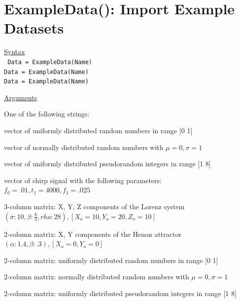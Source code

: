 \documentclass[12pt, a4paper, titlepage, openany]{book}
\begin{document}
\newpage
\section{\normalsize ExampleData():  Import Example Datasets} \label{ExampleData()}
\noindent\ul{Syntax} \vspace{6mm} \\ \noindent \texttt{\footnotesize
Data = ExampleData(Name)\\
Data = ExampleData(Name)\\
Data = ExampleData(Name)}

\noindent \ul{Arguments}
\begin{description}[labelsep=1cm, labelwidth=2cm, nosep,,style=multiline,leftmargin=3cm]\footnotesize
\item[\texttt{Name}]	One of the following strings:

\begin{description}[labelsep=1cm, labelwidth=4cm, nosep,style=multiline,leftmargin=4cm]\footnotesize
\item[\texttt{'uniform'}]	vector of uniformly distributed random numbers in range [0 1]
\item[\texttt{'gaussian'}]  vector of normally distributed random numbers with $\mu = 0, \sigma = 1$
\item[\texttt{'randintegers'}]  vector of uniformly distributed pseudorandom integers in range [1 8]
\item[\texttt{'chirp'}]   vector of chirp signal with the following parameters:\\
			    $f_0 = .01, t_1 = 4000, f_1 = .025$ \\
\item[\texttt{'lorenz'}] 3-column matrix: X, Y, Z components of the Lorenz system \\
$(\sigma: 10, \beta: \frac{8}{3}, rho: 28),   [X_o = 10, Y_o = 20, Z_o = 10]$
\item[\texttt{'henon'}] 2-column matrix: X, Y components of the Henon attractor 
	$(\alpha: 1.4, \beta: .3),   [X_o = 0, Y_o = 0] $ \\

\item[\texttt{'uniform2'}]    2-column matrix: uniformly distributed random numbers in range [0 1]
\item[\texttt{'gaussian2'}]   2-column matrix: normally distributed random numbers with $\mu = 0, \sigma = 1$
\item[\texttt{'randintegers2'}]  2-column matrix: uniformly distributed pseudorandom integers in range [1 8]\\


\end{description}
\end{description}
\end{document}
